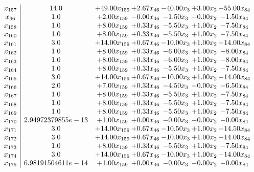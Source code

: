 \documentclass[8pt]{article}
\begin{document}
\[\begin{array}{c| c c@{\hskip 2pt} c@{\hskip 2pt} c@{\hskip 2pt} c@{\hskip 2pt} c@{\hskip 2pt} }
 x_{157}   &  14.0 & + 49.00 x_{159} & +  2.67 x_{46} & -40.00 x_{3} & +  3.00 x_{2} & -55.00 x_{84}\\
 x_{96}   &  1.0 & +  2.00 x_{159} & -0.00 x_{46} & -1.50 x_{3} & -0.00 x_{2} & -1.50 x_{84}\\
 x_{158}   &  1.0 & +  8.00 x_{159} & +  0.33 x_{46} & -5.50 x_{3} & +  1.00 x_{2} & -7.50 x_{84}\\
 x_{160}   &  1.0 & +  8.00 x_{159} & +  0.33 x_{46} & -5.50 x_{3} & +  1.00 x_{2} & -7.50 x_{84}\\
 x_{161}   &  3.0 & + 14.00 x_{159} & +  0.67 x_{46} & -10.00 x_{3} & +  1.00 x_{2} & -14.00 x_{84}\\
 x_{162}   &  1.0 & +  8.00 x_{159} & +  0.33 x_{46} & -6.00 x_{3} & +  1.00 x_{2} & -8.00 x_{84}\\
 x_{163}   &  1.0 & +  8.00 x_{159} & +  0.33 x_{46} & -6.00 x_{3} & +  1.00 x_{2} & -8.00 x_{84}\\
 x_{164}   &  1.0 & +  8.00 x_{159} & +  0.33 x_{46} & -5.50 x_{3} & +  1.00 x_{2} & -7.50 x_{84}\\
 x_{165}   &  3.0 & + 14.00 x_{159} & +  0.67 x_{46} & -10.00 x_{3} & +  1.00 x_{2} & -14.00 x_{84}\\
 x_{166}   &  2.0 & +  7.00 x_{159} & +  0.33 x_{46} & -4.50 x_{3} & -0.00 x_{2} & -6.50 x_{84}\\
 x_{167}   &  1.0 & +  8.00 x_{159} & +  0.33 x_{46} & -5.50 x_{3} & +  1.00 x_{2} & -7.50 x_{84}\\
 x_{168}   &  1.0 & +  8.00 x_{159} & +  0.33 x_{46} & -5.50 x_{3} & +  1.00 x_{2} & -7.50 x_{84}\\
 x_{169}   &  1.0 & +  8.00 x_{159} & +  0.33 x_{46} & -5.50 x_{3} & +  1.00 x_{2} & -7.50 x_{84}\\
 x_{170}   &  2.94972379855e-13 & +  1.00 x_{159} & +  0.00 x_{46} & -0.00 x_{3} & -0.00 x_{2} & -0.00 x_{84}\\
 x_{171}   &  3.0 & + 14.00 x_{159} & +  0.67 x_{46} & -10.50 x_{3} & +  1.00 x_{2} & -14.50 x_{84}\\
 x_{172}   &  3.0 & + 14.00 x_{159} & +  0.67 x_{46} & -10.00 x_{3} & +  1.00 x_{2} & -14.00 x_{84}\\
 x_{173}   &  1.0 & +  8.00 x_{159} & +  0.33 x_{46} & -5.50 x_{3} & +  1.00 x_{2} & -7.50 x_{84}\\
 x_{174}   &  3.0 & + 14.00 x_{159} & +  0.67 x_{46} & -10.00 x_{3} & +  1.00 x_{2} & -14.00 x_{84}\\
 x_{175}   &  6.98191504611e-14 & +  1.00 x_{159} & +  0.00 x_{46} & -0.00 x_{3} & -0.00 x_{2} & -0.00 x_{84}\\

\end{array}\]
\end{document}
